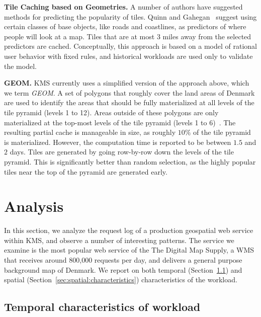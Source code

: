 \documentclass[11pt, oneside]{report}
\newcommand{\minisec}[1]{\noindent\textbf{#1.}}
\begin{document}
\minisec{Tile Caching based on Geometries}
A number of authors have suggested methods for predicting the popularity of tiles. Quinn and Gahegan~\cite{quinn10} suggest using certain classes of base objects, like roads and coastlines, as predictors of where people will look at a map. Tiles that are at most 3 miles away from the selected predictors are cached. Conceptually, this approach is based on a model of rational user behavior with fixed rules, and historical workloads are used only to validate the model.

\minisec{GEOM}
KMS currently uses a simplified version of the approach above, which we term \emph{GEOM}. A set of polygons that roughly cover the land areas of Denmark are used to identify the areas that should be fully materialized at all levels of the tile pyramid (levels 1 to 12). Areas outside of these polygons are only materialized at the top-most levels of the tile pyramid (levels 1 to 6)~\cite{lindegaard12}. The resulting partial cache is manageable in size, as roughly $10\%$ of the tile pyramid is materialized. However, the computation time is reported to be between $1.5$ and $2$ days. Tiles are generated by going row-by-row down the levels of the tile pyramid. This is significantly better than random selection, as the highly popular tiles near the top of the pyramid are generated early.

\section{Analysis}
\label{sec:analysis}

In this section, we analyze the request log of a production geospatial web service within KMS, and observe a number of interesting patterns.
The service we examine is the most popular web service of the The Digital Map Supply, a WMS that receives around 800,000 requests per day, and delivers a general purpose background map of Denmark. We report on both temporal (Section~\ref{sec:temporal:characteristics}) and spatial (Section~\ref{sec:spatial:characteristics}) characteristics of the workload.

\subsection{Temporal characteristics of workload}
\label{sec:temporal:characteristics}
\end{document}
